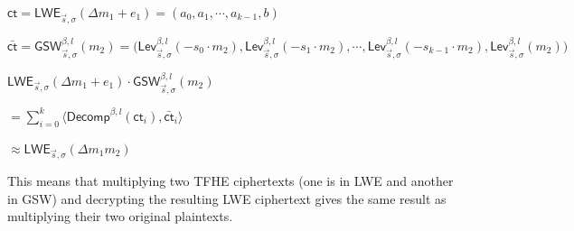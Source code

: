 \begin{tcolorbox}[title={\textbf{\tboxlabel{\ref*{subsec:tfhe-mult-cipher}} TFHE Ciphertext-to-Ciphertext Multiplication}}]
$\textsf{ct} = \textsf{LWE}_{\vec{s}, \sigma}(\Delta m_1 + e_1) = (a_0, a_1, \cdots, a_{k-1}, b)$

$\bar{\textsf{ct}} = \textsf{GSW}_{\vec{s}, \sigma}^{\beta, l}(m_2) = \bm( \textsf{Lev}_{\vec{s}, \sigma}^{\beta, l}(-s_0\cdot m_2), \textsf{Lev}_{\vec{s}, \sigma}^{\beta, l}(-s_1\cdot m_2), \cdots, \textsf{Lev}_{\vec{s}, \sigma}^{\beta, l}(-s_{k-1}\cdot m_2), \textsf{Lev}_{\vec{s}, \sigma}^{\beta, l}(m_2)  \bm)$

$\textsf{LWE}_{\vec{s}, \sigma}(\Delta m_1 + e_1) \cdot \textsf{GSW}_{\vec{s}, \sigma}^{\beta, l}(m_2) $

$= \sum\limits_{i=0}^{k}\langle \textsf{Decomp}^{\beta, l}(\textsf{ct}_i), \bar{\textsf{ct}}_i \rangle $

$\approx \textsf{LWE}_{\vec{s}, \sigma}(\Delta m_1 m_2)$
\end{tcolorbox}

This means that multiplying two TFHE ciphertexts (one is in LWE and another in GSW) and decrypting the resulting LWE ciphertext gives the same result as multiplying their two original plaintexts. 


